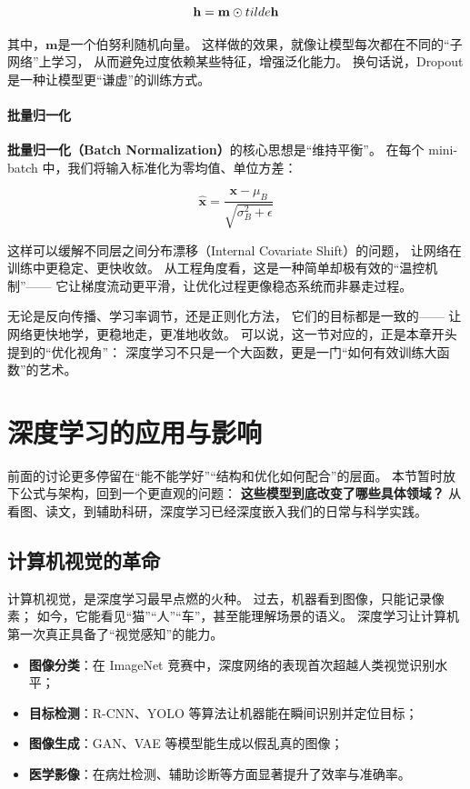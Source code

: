 $$\mathbf{h} = \mathbf{m} \odot \\tilde{\mathbf{h}}$$

其中，$\mathbf{m}$是一个伯努利随机向量。  
这样做的效果，就像让模型每次都在不同的“子网络”上学习，  
从而避免过度依赖某些特征，增强泛化能力。  
换句话说，Dropout 是一种让模型更“谦虚”的训练方式。  

\paragraph{批量归一化}  
\textbf{批量归一化（Batch Normalization）}的核心思想是“维持平衡”。  
在每个 mini-batch 中，我们将输入标准化为零均值、单位方差：  

$$\hat{\mathbf{x}} = \frac{\mathbf{x} - \mu_B}{\sqrt{\sigma_B^2 + \epsilon}}$$

这样可以缓解不同层之间分布漂移（Internal Covariate Shift）的问题，  
让网络在训练中更稳定、更快收敛。  
从工程角度看，这是一种简单却极有效的“温控机制”——  
它让梯度流动更平滑，让优化过程更像稳态系统而非暴走过程。

无论是反向传播、学习率调节，还是正则化方法，  
它们的目标都是一致的——  
让网络更快地学，更稳地走，更准地收敛。  
可以说，这一节对应的，正是本章开头提到的“优化视角”：  
深度学习不只是一个大函数，更是一门“如何有效训练大函数”的艺术。

\section{深度学习的应用与影响}

前面的讨论更多停留在“能不能学好”“结构和优化如何配合”的层面。  
本节暂时放下公式与架构，回到一个更直观的问题：  
\textbf{这些模型到底改变了哪些具体领域？}  
从看图、读文，到辅助科研，深度学习已经深度嵌入我们的日常与科学实践。

\subsection{计算机视觉的革命}

计算机视觉，是深度学习最早点燃的火种。  
过去，机器看到图像，只能记录像素；  
如今，它能看见“猫”“人”“车”，甚至能理解场景的语义。  
深度学习让计算机第一次真正具备了“视觉感知”的能力。

\begin{itemize}
\item \textbf{图像分类}：在 ImageNet 竞赛中，深度网络的表现首次超越人类视觉识别水平；
\item \textbf{目标检测}：R-CNN、YOLO 等算法让机器能在瞬间识别并定位目标；
\item \textbf{图像生成}：GAN、VAE 等模型能生成以假乱真的图像；
\item \textbf{医学影像}：在病灶检测、辅助诊断等方面显著提升了效率与准确率。
\end{itemize}


